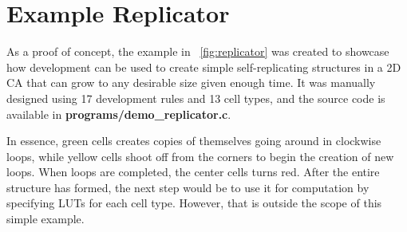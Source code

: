 
\section{Example Replicator}

As a proof of concept, the example in \figurename~\ref{fig:replicator} was created to showcase how development can be used to create simple self-replicating structures in a 2D CA that can grow to any desirable size given enough time.
It was manually designed using 17 development rules and 13 cell types, and the source code is available in \textbf{programs/demo\_replicator.c}.

In essence, green cells creates copies of themselves going around in clockwise loops, while yellow cells shoot off from the corners to begin the creation of new loops.
When loops are completed, the center cells turns red.
After the entire structure has formed, the next step would be to use it for computation by specifying LUTs for each cell type.
However, that is outside the scope of this simple example.

